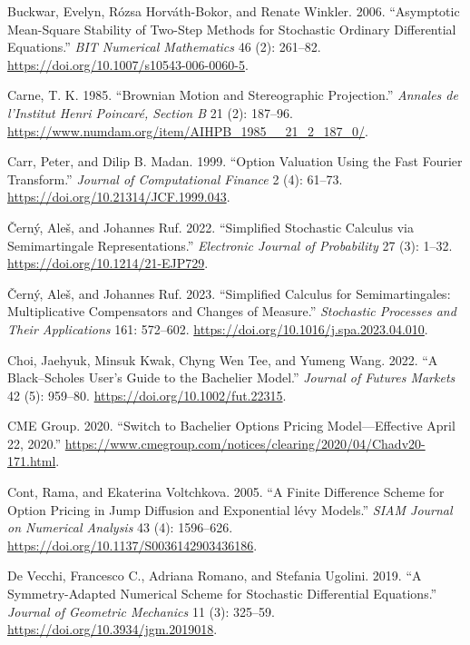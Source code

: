 \documentclass[
  english,
  10pt,
  letterpaper,
  DIV=11,
  numbers=noendperiod]{scrartcl}
\newlength{\cslhangindent}
\newenvironment{CSLReferences}[2] %
 {\begin{list}{}{%
  \setlength{\itemindent}{0pt}
  \setlength{\leftmargin}{0pt}
  \setlength{\parsep}{0pt}
  \ifodd #1
   \setlength{\leftmargin}{\cslhangindent}
   \setlength{\itemindent}{-1\cslhangindent}
  \fi
  \setlength{\itemsep}{#2\baselineskip}}}
 {\end{list}}
\theoremstyle{definition}
\theoremstyle{plain}
\theoremstyle{plain}
\theoremstyle{remark}
\begin{document}
\begin{CSLReferences}{1}{1}
Buckwar, Evelyn, Rózsa Horváth-Bokor, and Renate Winkler. 2006.
{``Asymptotic Mean-Square Stability of Two-Step Methods for Stochastic
Ordinary Differential Equations.''} \emph{BIT Numerical Mathematics} 46
(2): 261--82. \url{https://doi.org/10.1007/s10543-006-0060-5}.

Carne, T. K. 1985. {``Brownian Motion and Stereographic Projection.''}
\emph{Annales de l'Institut Henri Poincar{é}, Section B} 21 (2):
187--96. \url{https://www.numdam.org/item/AIHPB_1985__21_2_187_0/}.

Carr, Peter, and Dilip B. Madan. 1999. {``Option Valuation Using the
Fast Fourier Transform.''} \emph{Journal of Computational Finance} 2
(4): 61--73. \url{https://doi.org/10.21314/JCF.1999.043}.

Černý, Aleš, and Johannes Ruf. 2022. {``Simplified Stochastic Calculus
via Semimartingale Representations.''} \emph{Electronic Journal of
Probability} 27 (3): 1--32. \url{https://doi.org/10.1214/21-EJP729}.

Černý, Aleš, and Johannes Ruf. 2023. {``Simplified Calculus for
Semimartingales: Multiplicative Compensators and Changes of Measure.''}
\emph{Stochastic Processes and Their Applications} 161: 572--602.
\url{https://doi.org/10.1016/j.spa.2023.04.010}.

Choi, Jaehyuk, Minsuk Kwak, Chyng Wen Tee, and Yumeng Wang. 2022. {``A
Black--Scholes User's Guide to the Bachelier Model.''} \emph{Journal of
Futures Markets} 42 (5): 959--80.
\url{https://doi.org/10.1002/fut.22315}.

CME Group. 2020. {``Switch to Bachelier Options Pricing
Model---Effective April 22, 2020.''}
\url{https://www.cmegroup.com/notices/clearing/2020/04/Chadv20-171.html}.

Cont, Rama, and Ekaterina Voltchkova. 2005. {``A Finite Difference
Scheme for Option Pricing in Jump Diffusion and Exponential l{é}vy
Models.''} \emph{SIAM Journal on Numerical Analysis} 43 (4): 1596--626.
\url{https://doi.org/10.1137/S0036142903436186}.

De Vecchi, Francesco C., Adriana Romano, and Stefania Ugolini. 2019.
{``A Symmetry-Adapted Numerical Scheme for Stochastic Differential
Equations.''} \emph{Journal of Geometric Mechanics} 11 (3): 325--59.
\url{https://doi.org/10.3934/jgm.2019018}.


\end{CSLReferences}
\end{document}
